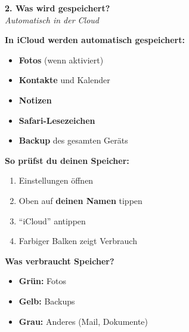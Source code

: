 \documentclass[a4paper,landscape,8pt]{extarticle}
\begin{document}
\hfill%
\begin{minipage}[t]{0.32\linewidth}
\begin{center}
\colorbox{syncgreen!15}{%
\begin{minipage}{0.95\linewidth}
\vspace{2mm}
\begin{center}
{\Large\bfseries\textcolor{syncgreen}{2. Was wird gespeichert?}}\\[1pt]
{\footnotesize\itshape Automatisch in der Cloud}
\end{center}
\vspace{2mm}
\end{minipage}%
}
\end{center}

\vspace{1mm}

\textbf{In iCloud werden automatisch gespeichert:}
\begin{itemize}
\item \textbf{Fotos} (wenn aktiviert)
\item \textbf{Kontakte} und Kalender
\item \textbf{Notizen}
\item \textbf{Safari-Lesezeichen}
\item \textbf{Backup} des gesamten Geräts
\end{itemize}

\textbf{So prüfst du deinen Speicher:}
\begin{enumerate}
\item Einstellungen öffnen
\item Oben auf \textbf{deinen Namen} tippen
\item ``iCloud'' antippen
\item Farbiger Balken zeigt Verbrauch
\end{enumerate}

\textbf{Was verbraucht Speicher?}
\begin{itemize}
\item \textcolor{syncgreen}{\textbf{Grün:}} Fotos
\item \textcolor{storageoran}{\textbf{Gelb:}} Backups
\item \textcolor{bordergray}{\textbf{Grau:}} Anderes (Mail, Dokumente)
\end{itemize}

\end{minipage}%
\hfill%
\end{document}
